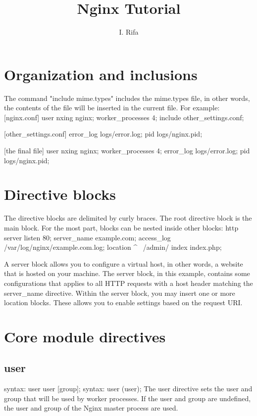 \documentclass[12pt]{article}
\title{Nginx Tutorial}
\author{I. Rifa}
\begin{document}
\maketitle

\section{Organization and inclusions}

The command "include mime.types" includes the mime.types file, in other words,
the contents of the file will be inserted in the current file.
For example:
[nginx.conf]
user nxing nginx;
worker_processes 4;
include other_settings.conf;

[other_settings.conf]
error_log logs/error.log;
pid logs/nginx.pid;

[the final file]
user nxing nginx;
worker_processes 4;
error_log logs/error.log;
pid logs/nginx.pid;

\section{Directive blocks}

The directive blocks are delimited by curly braces.
The root directive block is the main block. For the most part, blocks can be
nested inside other blocks:
 http {
    server {
        listen 80;
        server_name example.com;
        access_log /var/log/nginx/example.com.log;
        location ^~ /admin/ {
            index index.php;
       }
    }
 }

 A server block allows you to configure a virtual host, in other words,
 a website that is hosted on your machine. The server block, in this example,
 contains some configurations that applies to all HTTP requests with a host
 header matching the server_name directive.
 Within the server block, you may insert one or more location blocks. These allows
 you to enable settings based on the request URI.

\section{Core module directives}

\subsection{user}
syntax: user user [group];
syntax: user (user);
The user directive sets the user and group that will be used by worker processes.
If the user and group are undefined, the user and group of the Nginx master process are used.
\end{document}
